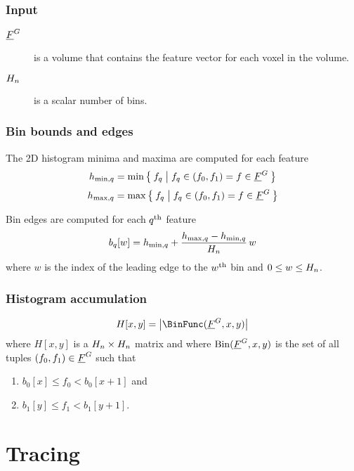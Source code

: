 \documentclass[12pt]{article}
\begin{document}
\subsubsection{Input}

\begin{description}
	\item[\(\underline{F}^{G}\)] is a volume that contains the feature vector for each
		voxel in the volume.
	\item[\(H_{n}\)] is a scalar number of bins.
\end{description}

\subsubsection{Bin bounds and edges}

The 2D histogram minima and maxima are computed for each feature
\begin{equation*}
	h_{\mathrm{min},q} = \min \Set{ f_{q} | f_{q} \in ( f_0, f_1 ) = f \in \underline{F}^{G}}
\end{equation*}
\begin{equation*}
	h_{\mathrm{max},q} = \max \Set{ f_{q} | f_{q} \in ( f_0, f_1 ) = f \in \underline{F}^{G}}
\end{equation*}

Bin edges are computed for each \({q}^{\mathrm{th}}\) feature
\begin{equation*}
	b_{q}[w] =
		h_{\mathrm{min},q} +
		\frac{ h_{\mathrm{max},q}  - h_{\mathrm{min},q}  }
		     { H_{n} } \, w
\end{equation*}
where \(w\) is the index of the leading edge to the
\(w^{\mathrm{th}}\) bin and \( 0 \le w \le  H_{n} \).

\subsubsection{Histogram accumulation}

\begin{equation*}
	H[x,y] =  \Dim{ \BinFunc(\FeaturesName, x, y) }
\end{equation*}
where \(H[x,y]\) is a \(H_{n} \times H_{n}\) matrix and
where \(\operatorname{Bin}(\underline{F}^{G}, x, y)\) is the set of all tuples
\((f_0, f_1) \in \underline{F}^{G}\) such that
\begin{enumerate}
	\item \(b_0[x] \le f_0 < b_0[x+1]\) and
	\item \(b_1[y] \le f_1 < b_1[y+1]\).
\end{enumerate}



\section{Tracing}
\end{document}
